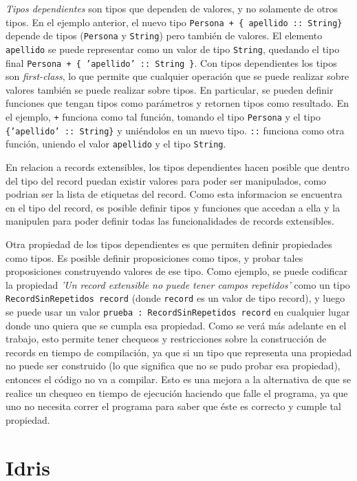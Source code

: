 \textit{Tipos dependientes} son tipos que dependen de valores, y no solamente de otros tipos. En el ejemplo anterior, el nuevo tipo \texttt{Persona + \{ apellido :: String\}} depende de tipos (\texttt{Persona} y \texttt{String}) pero también de valores. El elemento \texttt{apellido} se puede representar como un valor de tipo \texttt{String}, quedando el tipo final \texttt{Persona + \{ 'apellido' :: String \}}. Con tipos dependientes los tipos son \textit{first-class}, lo que permite que cualquier operación que se puede realizar sobre valores también se puede realizar sobre tipos. En particular, se pueden definir funciones que tengan tipos como parámetros y retornen tipos como resultado. En el ejemplo, \texttt{+} funciona como tal función, tomando el tipo \texttt{Persona} y el tipo \texttt{\{'apellido' :: String\}} y uniéndolos en un nuevo tipo. \texttt{::} funciona como otra función, uniendo el valor \texttt{apellido} y el tipo \texttt{String}. 

En relacion a records extensibles, los tipos dependientes hacen posible que dentro del tipo del record puedan existir valores para poder ser manipulados, como podrian ser la lista de etiquetas del record. Como esta informacion se encuentra en el tipo del record, es posible definir tipos y funciones que accedan a ella y la manipulen para poder definir todas las funcionalidades de records extensibles.

Otra propiedad de los tipos dependientes es que permiten definir propiedades como tipos. Es posible definir proposiciones como tipos, y probar tales proposiciones construyendo valores de ese tipo. Como ejemplo, se puede codificar la propiedad \textit{'Un record extensible no puede tener campos repetidos'} como un tipo \texttt{RecordSinRepetidos record} (donde \texttt{record} es un valor de tipo record), y luego se puede usar un valor \texttt{prueba : RecordSinRepetidos record} en cualquier lugar donde uno quiera que se cumpla esa propiedad. Como se verá más adelante en el trabajo, esto permite tener chequeos y restricciones sobre la construcción de records en tiempo de compilación, ya que si un tipo que representa una propiedad no puede ser construido (lo que significa que no se pudo probar esa propiedad), entonces el código no va a compilar. Esto es una mejora a la alternativa de que se realice un chequeo en tiempo de ejecución haciendo que falle el programa, ya que uno no necesita correr el programa para saber que éste es correcto y cumple tal propiedad.

\section{Idris}

